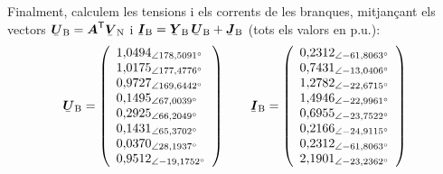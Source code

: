 \begin{exemple}
Finalment, calculem les tensions i els corrents de les branques,
mitjan\c{c}ant els vectors $\mcmplx{U}\ped{B} = \transp{\boldsymbol{A}}
\mcmplx{V}\ped{N}$ i $\mcmplx{I}\ped{B} =  \mcmplx{Y}\ped{B}\,
\mcmplx{U}\ped{B} + \mcmplx{J}\ped{B}$ (tots els valors en p.u.):
\[
   \mcmplx{U}\ped{B} =
   \left(\begin{array}{l}
     1{,}0494_{\angle 178{,}5091\degree} \\
     1{,}0175_{\angle 177{,}4776\degree} \\
     0{,}9727_{\angle 169{,}6442\degree} \\
     0{,}1495_{\angle 67{,}0039\degree} \\
     0{,}2925_{\angle 66{,}2049\degree} \\
     0{,}1431_{\angle 65{,}3702\degree} \\
     0{,}0370_{\angle 28{,}1937\degree} \\
     0{,}9512_{\angle -19{,}1752\degree}
   \end{array}\right)
   \qquad
   \mcmplx{I}\ped{B} =
   \left(\begin{array}{l}
     0{,}2312_{\angle -61{,}8063\degree} \\
     0{,}7431_{\angle -13{,}0406\degree} \\
     1{,}2782_{\angle -22{,}6715\degree} \\
     1{,}4946_{\angle -22{,}9961\degree} \\
     0{,}6955_{\angle -23{,}7522\degree} \\
     0{,}2166_{\angle -24{,}9115\degree} \\
     0{,}2312_{\angle -61{,}8063\degree} \\
     2{,}1901_{\angle -23{,}2362\degree}
   \end{array}\right)
\]


\end{exemple}
